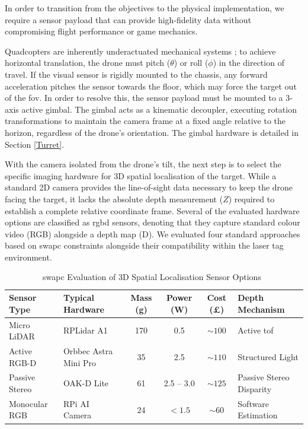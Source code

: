 \documentclass{report_template_oxford}
\begin{document}
In order to transition from the objectives to the physical implementation, we require a sensor payload that can provide high-fidelity data without compromising flight performance or game mechanics. 

Quadcopters are inherently underactuated mechanical systems \cite{underactuated}; to achieve horizontal translation, the drone must pitch ($\theta$) or roll ($\phi$) in the direction of travel. If the visual sensor is rigidly mounted to the chassis, any forward acceleration pitches the sensor towards the floor, which may force the target out of the \gls{fov}. In order to resolve this, the sensor payload must be mounted to a 3-axis active gimbal. The gimbal acts as a kinematic decoupler, executing rotation transformations to maintain the camera frame at a fixed angle relative to the horizon, regardless of the drone's orientation. The gimbal hardware is detailed in Section \ref{Turret}.

With the camera isolated from the drone's tilt, the next step is to select the specific imaging hardware for 3D spatial localisation of the target. While a standard 2D camera provides the line-of-sight data necessary to keep the drone facing the target, it lacks the absolute depth measurement ($Z$) required to establish a complete relative coordinate frame. Several of the evaluated hardware options are classified as \gls{rgbd} sensors, denoting that they capture standard colour video (RGB) alongside a depth map (D). We evaluated four standard approaches based on \gls{swapc} constraints alongside their compatibility within the laser tag environment. 

\begin{table}[htbp]
    \centering
    \caption{\gls{swapc} Evaluation of 3D Spatial Localisation Sensor Options~\cite{slamtec_rplidar_a1, orbbec_astra_mini_pro, oakd_lite_specs, raspberrypi_ai_camera}}
    \label{tab:sensor_swapc}
    \small
    \begin{tabularx}{\textwidth}{@{}llcccX@{}}
        \toprule
        \textbf{Sensor Type} & \textbf{Typical Hardware} & \textbf{Mass (g)} & \textbf{Power (W)} & \textbf{Cost (£)} & \textbf{Depth Mechanism} \\
        \midrule
        Micro LiDAR & RPLidar A1 & 170 & 0.5 & $\sim 100$ & Active \gls{tof} \\
        \midrule
        Active RGB-D & Orbbec Astra Mini Pro & 35 & 2.5 & $\sim 110$ & Structured Light \\
        \midrule
        Passive Stereo & OAK-D Lite & 61 & 2.5 -- 3.0 & $\sim 125$ & Passive Stereo Disparity \\
        \midrule
        Monocular RGB & RPi AI Camera & 24 & $< 1.5$ & $\sim 60$ & Software Estimation \\
        \bottomrule
    \end{tabularx}
\end{table}
\end{document}
